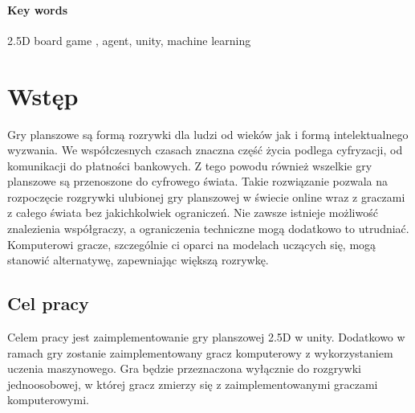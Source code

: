 \documentclass[a4paper,twoside,12pt]{book}
\newcounter{stronyPozaNumeracja}
\begin{document}
	\subsubsection*{Key words} 
	\begin{otherlanguage}{british}
	2.5D board game , agent, unity, machine learning 
	\end{otherlanguage}
	
	\newpage
	
	
	\tableofcontents
	
	\setcounter{stronyPozaNumeracja}{\value{page}}
	\mainmatter
	\pagestyle{empty}
	
	\cleardoublepage
	
	\pagestyle{NumeryStronNazwyRozdzialow}
	
	
	\chapter{Wstęp}%
	\label{ch:wstep}
	Gry planszowe są formą rozrywki dla ludzi od wieków jak i formą intelektualnego wyzwania. We współczesnych czasach znaczna część życia podlega cyfryzacji, od komunikacji do płatności bankowych. Z tego powodu również wszelkie gry planszowe są przenoszone do cyfrowego świata. Takie rozwiązanie pozwala na rozpoczęcie rozgrywki ulubionej gry planszowej w świecie online wraz z graczami z całego świata bez jakichkolwiek ograniczeń. Nie zawsze istnieje możliwość znalezienia współgraczy, a ograniczenia techniczne mogą dodatkowo to utrudniać. Komputerowi gracze, szczególnie ci oparci na modelach uczących się, mogą stanowić alternatywę, zapewniając większą rozrywkę. 
	\section{Cel pracy} 
	Celem pracy jest zaimplementowanie gry planszowej 2.5D w unity. Dodatkowo w ramach gry zostanie zaimplementowany gracz komputerowy z wykorzystaniem uczenia maszynowego. Gra będzie przeznaczona wyłącznie do rozgrywki jednoosobowej, w której gracz zmierzy się z zaimplementowanymi graczami komputerowymi. 
	
\end{document}
